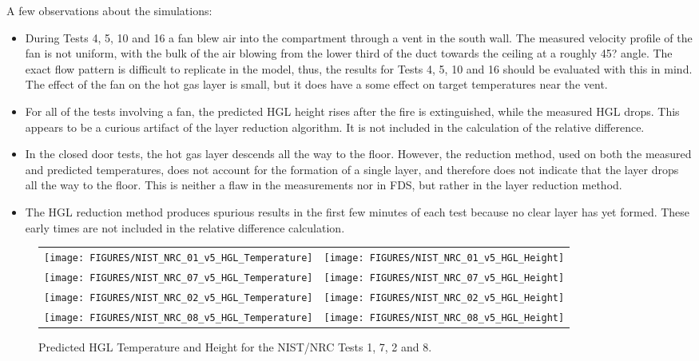 A few observations about the simulations:
\begin{itemize}
\item During Tests 4, 5, 10 and 16 a fan blew air into the compartment through a vent in the south wall.
The measured velocity profile of the fan is not uniform, with the bulk of the air blowing from the lower third of the duct towards the ceiling at a
roughly 45? angle.  The exact flow pattern is difficult to replicate in the model, thus, the results for Tests 4, 5, 10 and 16 should be evaluated
with this in mind. The effect of the fan on the hot gas layer is small, but it does have a some effect on target temperatures near the vent.
\item For all of the tests involving a fan, the predicted HGL height rises after the fire is extinguished,
while the measured HGL drops.  This appears to be a curious artifact of the layer reduction algorithm. It is not included in the calculation of the
relative difference.
\item In the closed door tests, the hot gas layer descends all the way to the floor.
However, the reduction method, used on both the measured and predicted temperatures, does not account for the formation of a single layer, and
therefore does not indicate that the layer drops all the way to the floor. This is neither a flaw in the measurements nor in FDS, but rather in the
layer reduction method.
\item The HGL reduction method produces spurious results in the first few minutes of each test because no clear layer has yet formed.
These early times are not included in the relative difference calculation.
\end{itemize}

\begin{figure}[p]
\begin{tabular*}{\textwidth}{l@{\extracolsep{\fill}}r}
\texttt{[image: FIGURES/NIST\_NRC\_01\_v5\_HGL\_Temperature]} &
\texttt{[image: FIGURES/NIST\_NRC\_01\_v5\_HGL\_Height]} \\
\texttt{[image: FIGURES/NIST\_NRC\_07\_v5\_HGL\_Temperature]} &
\texttt{[image: FIGURES/NIST\_NRC\_07\_v5\_HGL\_Height]} \\
\texttt{[image: FIGURES/NIST\_NRC\_02\_v5\_HGL\_Temperature]} &
\texttt{[image: FIGURES/NIST\_NRC\_02\_v5\_HGL\_Height]} \\
\texttt{[image: FIGURES/NIST\_NRC\_08\_v5\_HGL\_Temperature]} &
\texttt{[image: FIGURES/NIST\_NRC\_08\_v5\_HGL\_Height]}
\end{tabular*}
\caption{Predicted HGL Temperature and Height for the NIST/NRC Tests 1, 7, 2 and 8.} \label{NIST_NRC_HGL_Closed_1}
\end{figure}

